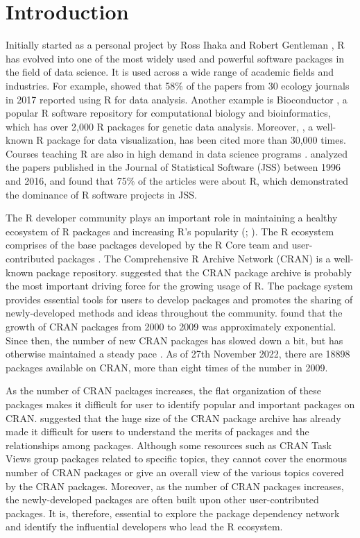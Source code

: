 \section{Introduction}

Initially started as a personal project by Ross Ihaka and Robert Gentleman \citep{ihaka1996r}, R has evolved into one of the most widely used and powerful software packages in the field of data science. It is used across a wide range of academic fields and industries.  For example, \citet{lai2019evaluating} showed that 58\% of the papers from 30 ecology journals in 2017 reported using R for data analysis. Another example is Bioconductor \citep{gentleman2004bioconductor}, a popular R software repository for computational biology and bioinformatics, which has over 2,000 R packages for genetic data analysis. Moreover,  \citep{wickham2011ggplot2}, a well-known R package for data visualization, has been cited more than 30,000 times. Courses teaching R are also in high demand in data science programs \citep{zhang2021data}. \citet{fox2016r} analyzed the papers published in the Journal of Statistical Software (JSS) between 1996 and 2016, and found that 75\% of the articles were about R, which demonstrated the dominance of R software projects in JSS. 

The R developer community plays an important role in maintaining a healthy ecosystem of R packages and increasing R's popularity (\citealp{RJ-2020-028}; \citealp{tippmann2015programming}). The R ecosystem comprises of the base packages developed by the R Core team and user-contributed packages \citep{german2013evolution}. The Comprehensive R Archive Network (CRAN) is a well-known package repository. \citet{fox2009aspects} suggested that the CRAN package archive is probably the most important driving force for the growing usage of R. The package system provides essential tools for users to develop packages and promotes the sharing of newly-developed methods and ideas throughout the community. \citet{fox2009aspects} found that the growth of CRAN packages from 2000 to 2009 was approximately exponential. Since then, the number of new CRAN packages has slowed down a bit, but has otherwise maintained a steady pace \citep{fox2016r}.  As of 27th November 2022, there are 18898 packages available on CRAN, more than eight times of the number in 2009.


As the number of CRAN packages increases, the flat organization of these packages \citep{fox2016r} makes it difficult for user to identify popular and important packages on CRAN.  \citet{RJ-2018-058} suggested that the huge size of the CRAN package archive has already made it difficult for users to understand the merits of packages and the relationships among packages. Although some resources such as CRAN Task Views \citep{zeileis2005cran} group packages related to specific topics, they cannot cover the enormous number of CRAN packages or give an overall view of the various topics covered by the CRAN packages. Moreover, as the number of CRAN packages increases, the newly-developed packages are often built upon other user-contributed packages.  It is, therefore, essential to explore the package dependency network and identify the influential developers who lead the R ecosystem.


